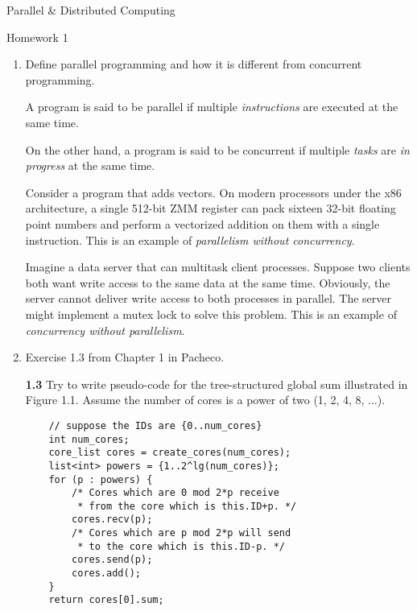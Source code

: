 \documentclass[11pt,epsfig,letterpaper]{article}
\begin{document}

    \vspace{5pc}
    \centerline{\huge Parallel \& Distributed Computing}
    \vspace{0.5pc}
    \centerline{\huge Homework 1}
    \vspace{3pc}


    \begin{enumerate}
            \item Define parallel programming and how it is different from concurrent programming.
            \vspace{0.5pc}


            \quad A program is said to be parallel if multiple {\it instructions} are executed at the same time.

            \quad On the other hand, a program is said to be concurrent if multiple {\it tasks} are {\it in progress} at the same time.

            \quad Consider a program that adds vectors. On modern processors under the {\sc x86} architecture, a single 512-bit {\sc ZMM} register can pack sixteen 32-bit floating point numbers and perform a vectorized addition on them with a single instruction. This is an example of {\it parallelism without concurrency}.

            \quad Imagine a data server that can multitask client processes. Suppose two clients both want write access to the same data at the same time. Obviously, the server cannot deliver write access to both processes in parallel. The server might implement a mutex lock to solve this problem. This is an example of {\it concurrency without parallelism}.


            \item Exercise 1.3 from Chapter 1 in Pacheco.

            {\bf 1.3} \>\> Try to write pseudo-code for the tree-structured global sum illustrated in Figure 1.1. Assume the number of cores is a power of two (1, 2, 4, 8, ...).
            \begin{verbatim}
    // suppose the IDs are {0..num_cores}
    int num_cores;
    core_list cores = create_cores(num_cores);
    list<int> powers = {1..2^lg(num_cores)};
    for (p : powers) {
        /* Cores which are 0 mod 2*p receive
         * from the core which is this.ID+p. */
        cores.recv(p);
        /* Cores which are p mod 2*p will send
         * to the core which is this.ID-p. */
        cores.send(p);
        cores.add();
    }
    return cores[0].sum;



\end{verbatim}
\end{enumerate}
\end{document}
